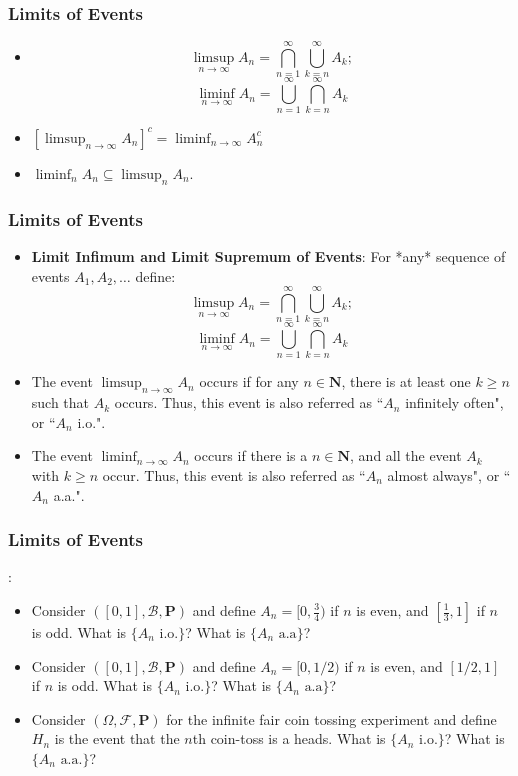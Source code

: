 \documentclass[handout]{beamer}
\newcommand{\BP}{\mathbf{P}}
\begin{document}
\frame
{
  \frametitle{Limits of Events}

   \begin{itemize}


    \item<1->  
$$\limsup_{n\rightarrow \infty} A_n = \bigcap_{n=1}^{\infty} \bigcup_{k=n}^{\infty} A_k;$$
$$\liminf_{n\rightarrow \infty} A_n=\bigcup_{n=1}^{\infty} \bigcap_{k=n}^{\infty} A_k$$  

\item<2->  $\left[ \limsup_{n\rightarrow \infty} A_n \right]^c = \liminf_{n\rightarrow \infty} A_n^c$

\item<3-> $ \liminf_n A_n \subseteq \limsup_n A_n$.


                 \end{itemize}
}

\frame
{
  \frametitle{Limits of Events}

   \begin{itemize}


    \item<1->  
      \textbf{Limit Infimum and Limit Supremum of Events}: For *any* sequence of events $A_1, A_2,\ldots$ define:
$$\limsup_{n\rightarrow \infty} A_n=\bigcap_{n=1}^{\infty} \bigcup_{k=n}^{\infty} A_k;$$
$$\liminf_{n\rightarrow \infty} A_n=\bigcup_{n=1}^{\infty} \bigcap_{k=n}^{\infty} A_k$$  

\item<2->  The event $\limsup_{n\rightarrow \infty} A_n$ occurs if for any $n\in \mathbf{N}$, there is at least one $k \geq n$ such that $A_k$ occurs. Thus, this event is also referred as ``$A_n$ infinitely often", or ``$A_n$ i.o.". 

\item<3->  The event $\liminf_{n\rightarrow \infty} A_n$ occurs if there is a $n\in \mathbf{N}$, and all the event $A_k$ with $k\geq n$ occur. Thus, this event is also referred as ``$A_n$ almost always", or ``$A_n$ a.a.".
               

                 \end{itemize}
}

\frame
{
  \frametitle{Limits of Events}
:

   \begin{itemize}
  
      \item<1->  Consider $([0,1],\mathcal{B},\BP)$ and define $A_n = [0,\frac{3}{4})$ if $n$ is even, and $[\frac{1}{3},1]$ if $n$ is odd. What is $\{A_n \text{ i.o.}\}$? What is $\{A_n \text{ a.a}\}$?
      
    \item<2->  Consider $([0,1],\mathcal{B},\BP)$ and define $A_n = [0,1/2)$ if $n$ is even, and $[1/2,1]$ if $n$ is odd. What is $\{A_n \text{ i.o.}\}$? What is $\{A_n \text{ a.a}\}$?

    \item<3->  Consider $(\Omega, \mathcal{F}, \BP)$ for the infinite fair coin tossing experiment and define $H_n$ is the event that the $n$th coin-toss is a heads. What is $\{A_n \text{ i.o.}\}$? What is $\{A_n \text{ a.a.}\}$?

  \end{itemize}
}
\end{document}
